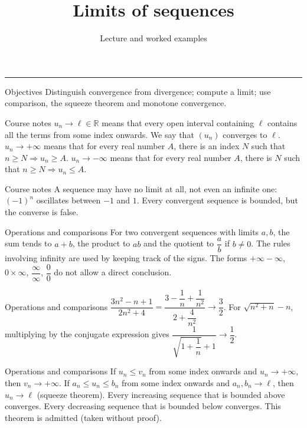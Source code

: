 \documentclass[aspectratio=169,10pt]{beamer}
\title{Limits of sequences}
\subtitle{Lecture and worked examples}
\date{}
\author{}
\providecommand{\R}{\mathbb{R}}
\begin{document}
\begin{frame}[plain]
\vfill
{\inserttitle\par}
\medskip
{\insertsubtitle\par}
\medskip
{\rule{\textwidth}{.5pt}}
\vfill
\end{frame}
\begin{frame}{Objectives}
Distinguish convergence from divergence; compute a limit; use comparison, the squeeze theorem and monotone convergence.
\end{frame}
\begin{frame}{Course notes}
\(u_n\to\ell\in\R\) means that every open interval containing \(\ell\) contains all the terms from some index onwards. We say that \((u_n)\) converges to \(\ell\).
\(u_n\to+\infty\) means that for every real number \(A\), there is an index \(N\) such that \(n\ge N\Rightarrow u_n\ge A\). \(u_n\to-\infty\) means that for every real number \(A\), there is \(N\) such that \(n\ge N\Rightarrow u_n\le A\).
\end{frame}
\begin{frame}{Course notes}
A sequence may have no limit at all, not even an infinite one: \((-1)^n\) oscillates between \(-1\) and \(1\). Every convergent sequence is bounded, but the converse is false.
\end{frame}
\begin{frame}{Operations and comparisons}
For two convergent sequences with limits \(a,b\), the sum tends to \(a+b\), the product to \(ab\) and the quotient to \(\dfrac{a}{b}\) if \(b\ne0\). The rules involving infinity are used by keeping track of the signs. The forms \(+\infty-\infty\), \(0\times\infty\), \(\dfrac{\infty}{\infty}\), \(\dfrac{0}{0}\) do not allow a direct conclusion.
\end{frame}
\begin{frame}{Operations and comparisons}
\(\dfrac{3n^2-n+1}{2n^2+4}=\dfrac{3-\dfrac{1}{n}+\dfrac{1}{n^2}}{2+\dfrac{4}{n^2}}\to\dfrac{3}{2}\). For \(\sqrt{n^2+n}-n\), multiplying by the conjugate expression gives \(\dfrac{1}{\sqrt{1+\dfrac{1}{n}}+1}\to\dfrac{1}{2}\).
\end{frame}
\begin{frame}{Operations and comparisons}
If \(u_n\le v_n\) from some index onwards and \(u_n\to+\infty\), then \(v_n\to+\infty\). If \(a_n\le u_n\le b_n\) from some index onwards and \(a_n,b_n\to\ell\), then \(u_n\to\ell\) (squeeze theorem).
Every increasing sequence that is bounded above converges. Every decreasing sequence that is bounded below converges. This theorem is admitted (taken without proof).
\end{frame}
\end{document}
